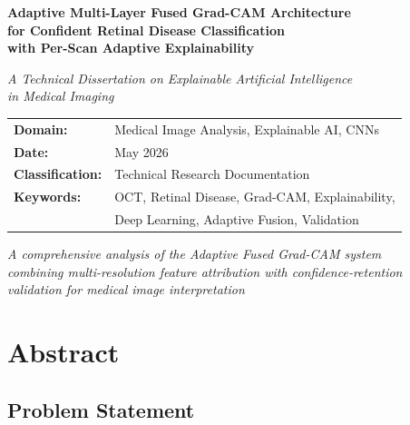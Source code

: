 \documentclass[12pt,a4paper,oneside]{book}
\begin{document}
\begin{titlepage}
\centering
\vspace*{2cm}

{\Huge \textbf{Adaptive Multi-Layer Fused Grad-CAM Architecture}}\\[0.5cm]
{\Large \textbf{for Confident Retinal Disease Classification}}\\[0.5cm]
{\Large \textbf{with Per-Scan Adaptive Explainability}}

\vspace{2cm}

{\large \textit{A Technical Dissertation on Explainable Artificial Intelligence}}\\
{\large \textit{in Medical Imaging}}

\vspace{3cm}

\begin{tabular}{ll}
  \textbf{Domain:} & Medical Image Analysis, Explainable AI, CNNs \\
  \textbf{Date:} & May 2026 \\
  \textbf{Classification:} & Technical Research Documentation \\
  \textbf{Keywords:} & OCT, Retinal Disease, Grad-CAM, Explainability, \\
  & Deep Learning, Adaptive Fusion, Validation
\end{tabular}

\vfill

{\large \textit{A comprehensive analysis of the Adaptive Fused Grad-CAM system}} \\
{\large \textit{combining multi-resolution feature attribution with confidence-retention}} \\
{\large \textit{validation for medical image interpretation}}

\end{titlepage}

\chapter*{Abstract}

\section*{Problem Statement}
\end{document}
